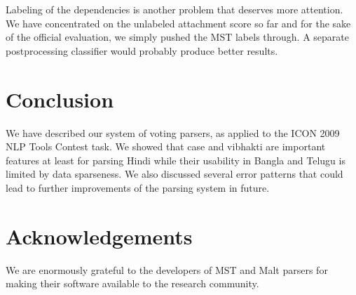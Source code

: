 \documentclass[11pt]{article}
\begin{document}
Labeling of the dependencies is another problem that deserves more attention. We have concentrated on the unlabeled attachment score so far and for the sake of the official evaluation, we simply pushed the MST labels through. A separate postprocessing classifier would probably produce better results.

\section{Conclusion}
\label{sec:concl}

We have described our system of voting parsers, as applied to the ICON 2009 NLP Tools Contest task. We showed that case and vibhakti are important features at least for parsing Hindi while their usability in Bangla and Telugu is limited by data sparseness. We also discussed several error patterns that could lead to further improvements of the parsing system in future.

\section*{Acknowledgements}

We are enormously grateful to the developers of MST and Malt parsers for making their software available to the research community.


\begin{small}

\end{small}
\end{document}
